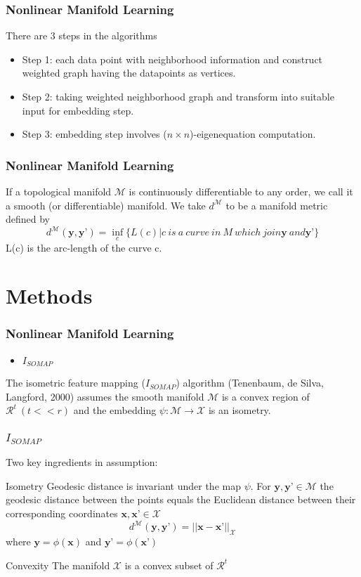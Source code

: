 \documentclass{beamer}
\begin{document}
\begin{frame}
\frametitle{Nonlinear Manifold Learning}
There are 3 steps in the algorithms
\begin{itemize}
  \item Step 1: each data point with neighborhood information and construct weighted graph having the datapoints as vertices.
  \item Step 2: taking weighted neighborhood graph and transform into suitable input for embedding step.
  \item Step 3: embedding step involves ($n \times n$)-eigenequation computation.
\end{itemize}
\end{frame}

\begin{frame}
\frametitle{Nonlinear Manifold Learning}
If a topological manifold $\mathcal{M}$ is continuously differentiable to any order, we call it a smooth (or differentiable) manifold.\newline
We take $d^{\mathcal{M}}$ to be a manifold metric defined by
\[d^{\mathcal{M}}(\textbf{y},\textbf{y'})=\inf_{c}\{L(c)|c\ is\ a\ curve\ in\ M\ which\ join \textbf{y}\ and \textbf{y'}\}\]
L(c) is the arc-length of the curve c.
\end{frame}

\section{Methods}

\begin{frame}
\frametitle{Nonlinear Manifold Learning}
\begin{itemize}
  \item $I_{SOMAP}$
\end{itemize}
  The isometric feature mapping ($I_{SOMAP}$) algorithm (Tenenbaum, de Silva, Langford, 2000) assumes the smooth manifold $\mathcal{M}$ is a convex region of $\mathcal{R}^t\ (t<<r)$ and the embedding $\psi:\mathcal{M}\rightarrow\mathcal{X}$ is an isometry.
\end{frame}

\begin{frame}
\frametitle{$I_{SOMAP}$}
  Two key ingredients in assumption:
  \begin{block}{Isometry}
  Geodesic distance is invariant under the map $\psi$. For $\textbf{y},\textbf{y'} \in \mathcal{M}$ the geodesic distance between the points equals the Euclidean distance between their corresponding coordinates $\textbf{x},\textbf{x'} \in \mathcal{X}$
  \[d^{\mathcal{M}}(\textbf{y},\textbf{y'})=||\textbf{x}-\textbf{x'}||_{\mathcal{X}}\]
  where $\textbf{y}=\phi(\textbf{x})$ and $\textbf{y'}=\phi(\textbf{x'})$
  \end{block}
  \begin{block}{Convexity}
  The manifold $\mathcal{X}$ is a convex subset of $\mathcal{R}^t$
  \end{block}
  
\end{frame}
\end{document}
